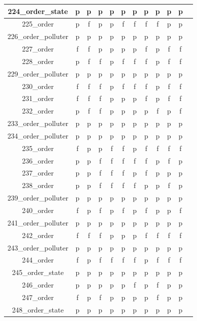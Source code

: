 \documentclass[
fancyheadings, %
%
%
]{stsreprt}
\begin{document}
\begin{longtable}{|c|c|c|c|c|c|c|c|c|c|c|c|}
224\_order\_state & p & p & p & p & p & p & p & p & p & p \\
\hline
225\_order & p & f & p & p & f & f & f & f & p & p \\
\hline
226\_order\_polluter & p & p & p & p & p & p & p & p & p & p \\
\hline
227\_order & f & f & p & p & p & p & f & p & f & f \\
\hline
228\_order & p & f & f & p & f & f & f & p & f & f \\
\hline
229\_order\_polluter & p & p & p & p & p & p & p & p & p & p \\
\hline
230\_order & f & f & f & p & f & f & f & p & f & f \\
\hline
231\_order & f & f & f & p & p & p & f & p & f & f \\
\hline
232\_order & p & f & f & p & p & p & p & f & p & f \\
\hline
233\_order\_polluter & p & p & p & p & p & p & p & p & p & p \\
\hline
234\_order\_polluter & p & p & p & p & p & p & p & p & p & p \\
\hline
235\_order & f & p & p & f & f & p & f & f & f & f \\
\hline
236\_order & p & p & f & f & f & f & f & p & f & p \\
\hline
237\_order & p & p & f & f & f & p & f & p & p & p \\
\hline
238\_order & p & p & f & f & f & f & p & p & f & p \\
\hline
239\_order\_polluter & p & p & p & p & p & p & p & p & p & p \\
\hline
240\_order & f & p & f & p & f & p & f & p & p & f \\
\hline
241\_order\_polluter & p & p & p & p & p & p & p & p & p & p \\
\hline
242\_order & f & f & f & p & p & p & f & f & f & f \\
\hline
243\_order\_polluter & p & p & p & p & p & p & p & p & p & p \\
\hline
244\_order & f & p & f & f & f & f & p & f & f & f \\
\hline
245\_order\_state & p & p & p & p & p & p & p & p & p & p \\
\hline
246\_order & p & p & p & p & p & f & p & f & p & p \\
\hline
247\_order & f & p & f & p & p & p & p & f & p & p \\
\hline
248\_order\_state & p & p & p & p & p & p & p & p & p & p \\

\end{longtable}
\end{document}
